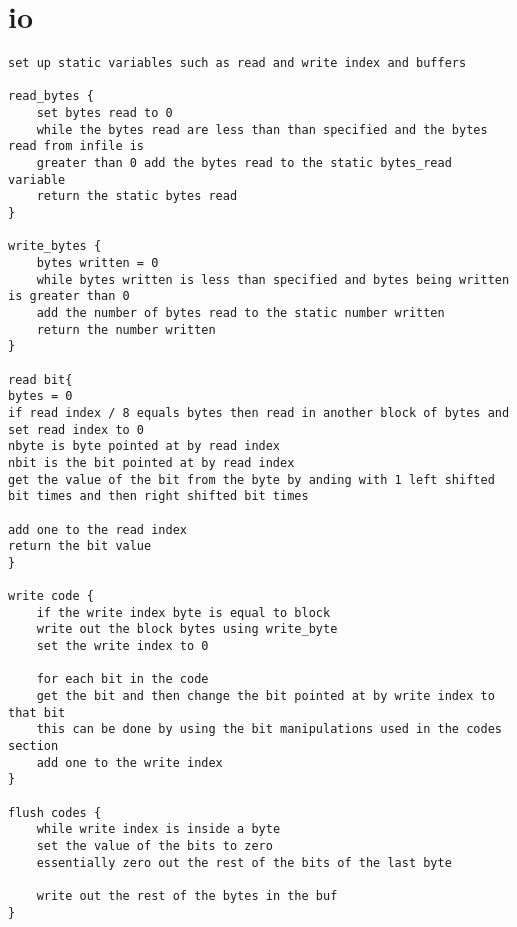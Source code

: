 \documentclass[11pt]{article}
\begin{document}
\section{io}
\begin{verbatim}
set up static variables such as read and write index and buffers

read_bytes {
    set bytes read to 0
    while the bytes read are less than than specified and the bytes read from infile is 
    greater than 0 add the bytes read to the static bytes_read variable
    return the static bytes read
}

write_bytes {
    bytes written = 0
    while bytes written is less than specified and bytes being written is greater than 0
    add the number of bytes read to the static number written
    return the number written
}

read bit{
bytes = 0
if read index / 8 equals bytes then read in another block of bytes and set read index to 0
nbyte is byte pointed at by read index
nbit is the bit pointed at by read index
get the value of the bit from the byte by anding with 1 left shifted bit times and then right shifted bit times

add one to the read index
return the bit value
}

write code {
    if the write index byte is equal to block
    write out the block bytes using write_byte
    set the write index to 0
    
    for each bit in the code
    get the bit and then change the bit pointed at by write index to that bit
    this can be done by using the bit manipulations used in the codes section
    add one to the write index
}

flush codes {
    while write index is inside a byte
    set the value of the bits to zero
    essentially zero out the rest of the bits of the last byte
    
    write out the rest of the bytes in the buf
}
\end{verbatim}
\end{document}
